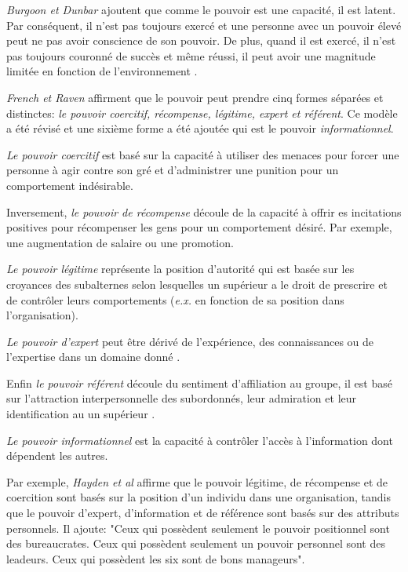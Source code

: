 			\emph{Burgoon et Dunbar} \cite{burgoon1998nature,dunbar2005perceptions} ajoutent que comme le pouvoir est une capacité, il est latent. Par conséquent, il n'est pas toujours exercé et une personne avec un pouvoir élevé peut ne pas avoir conscience de son pouvoir. De plus, quand il est exercé, il n'est pas toujours couronné de succès et même réussi, il peut avoir une magnitude limitée en fonction de l'environnement \cite{huston1983power}.
			
			\emph{French et Raven} \cite{french1959bases} affirment que le pouvoir peut prendre cinq formes séparées et distinctes: \textit{le pouvoir coercitif, récompense, légitime, expert et référent}. Ce modèle a été révisé et une sixième forme a été ajoutée qui est le pouvoir \textit{informationnel}.
			
			\textit{Le pouvoir coercitif} est basé sur la capacité à utiliser des menaces pour forcer une personne à agir contre son gré et d'administrer une punition pour un comportement indésirable.
			
			Inversement, \textit{le pouvoir de récompense} découle de la capacité à offrir es incitations positives pour récompenser les gens pour un comportement désiré. Par exemple, une augmentation de salaire ou une promotion.
			
			\textit{Le pouvoir légitime} représente la position d'autorité qui est basée sur les croyances des subalternes selon lesquelles un supérieur a le droit de prescrire et de contrôler leurs comportements (\emph{e.x.} en fonction de sa position dans l'organisation). 
			
			\textit{Le pouvoir d'expert} peut être dérivé de l'expérience, des connaissances ou de l'expertise dans un domaine donné \cite{van2006power}. 
			
			Enfin \textit{le pouvoir référent} découle du sentiment d'affiliation au groupe, il est basé sur l'attraction interpersonnelle des subordonnés, leur admiration et leur identification au un supérieur \cite{van2006power}. 
			
			\textit{Le pouvoir informationnel} est la capacité à contrôler l'accès à l'information dont dépendent les autres. 
			
			Par exemple,  \emph{Hayden et al} \cite{dietler2010feasts} affirme que le pouvoir légitime, de récompense et de coercition sont basés sur la position d'un individu dans une organisation, tandis que le pouvoir d'expert, d'information et de référence sont basés sur des attributs personnels. Il ajoute: "Ceux qui possèdent seulement le pouvoir positionnel sont des bureaucrates. Ceux qui possèdent seulement un pouvoir personnel sont des leadeurs. Ceux qui possèdent les six sont de bons manageurs".
			
